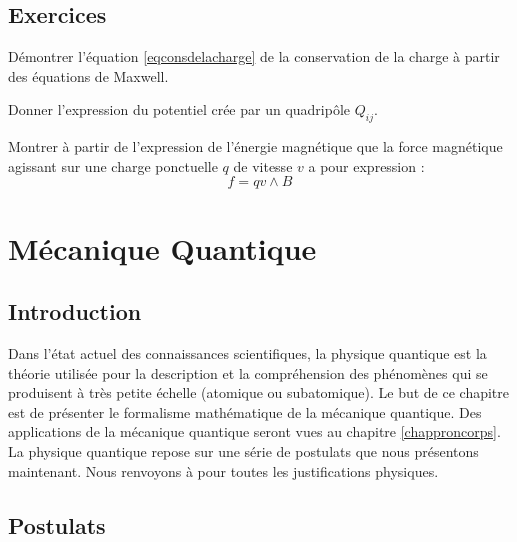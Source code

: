 \documentclass[12pt]{book}
\begin{document}
\section{Exercices}

\begin{exo}
D\'emontrer l'\'equation \ref{eqconsdelacharge} de la conservation de la
charge \`a partir des \'equations de Maxwell.
\end{exo}

\begin{exo}
Donner l'expression du potentiel cr\'ee par un quadrip\^ole $Q_{ij}$.
\end{exo}

\begin{exo}
Montrer \`a partir de l'expression de l'\'energie magn\'etique que la force
magn\'etique agissant sur une charge ponctuelle $q$ de vitesse $v$ a pour
expression : 
\begin{equation}
f=qv\wedge B
\end{equation}

\end{exo}

\chapter{M\'ecanique Quantique}\label{chapmq}

\section{Introduction}
Dans l'\'etat actuel des connaissances scientifiques, la physique
quantique est la th\'eorie utilis\'ee pour la description et la
compr\'ehension des ph\'enom\`enes qui se produisent \`a tr\`es petite
\'echelle (atomique ou subatomique).
Le but de ce chapitre est de pr\'esenter le formalisme math\'ematique
de la m\'ecanique quantique.
Des applications de la m\'ecanique quantique seront vues au chapitre
\ref{chapproncorps}.
La physique quantique repose sur une s\'erie de postulats que nous
pr\'esentons maintenant.
 Nous renvoyons \`a
\cite{ph:mecaq:Cohen73,ph:mecaq:Bohm93} pour 
toutes les justifications physiques.
\section{Postulats}
\end{document}
